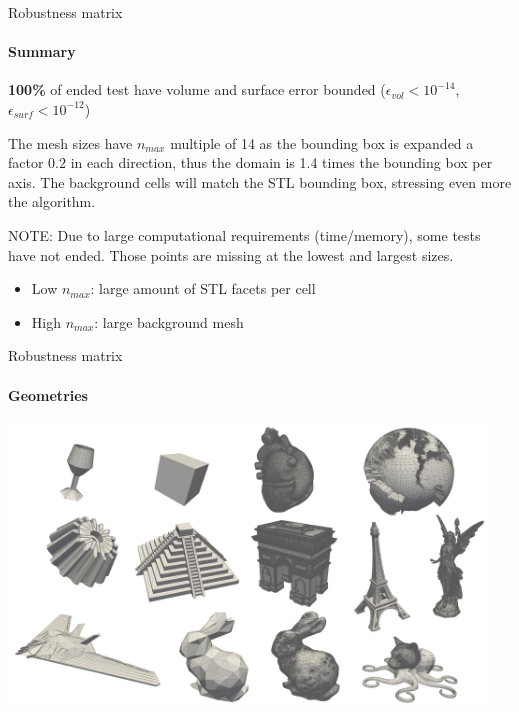 \documentclass{beamer}
\begin{document}
\begin{frame}{Robustness matrix}
  \framesubtitle{Summary}

  \textbf{100\%} of ended test have volume and surface error bounded 
  ($\epsilon_{vol} < 10^{-14}$,$\epsilon_{surf} < 10^{-12}$) 

  \begin{block}

  The mesh sizes have $n_{max}$ multiple of 14 as the bounding box is expanded 
  a factor $0.2$ in each direction, thus the domain is 1.4 times the 
  bounding box per axis. The background cells will match the STL bounding box, 
  stressing even more the algorithm.
  \end{block}

  \vfill{}
  NOTE: Due to large computational requirements (time/memory),
  some tests have not ended.
  Those points are missing at the lowest and largest sizes.
  \begin{itemize}
    \item
      Low $n_{max}$: large amount of STL facets per cell
    \item
      High $n_{max}$: large background mesh

  \end{itemize}
 

\end{frame}

\begin{frame}{Robustness matrix}
  \framesubtitle{Geometries}
  \includegraphics[width=0.95\textwidth]{matrix.pdf}
\end{frame}
\end{document}
